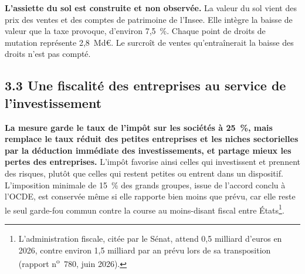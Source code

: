 \documentclass[10pt,a4paper]{article}
\begin{document}
\textbf{L'assiette du sol est construite et non observée.} La valeur du sol vient des prix des ventes et des comptes de
patrimoine de l'Insee. Elle intègre la baisse de valeur que la taxe provoque, d'environ 7,5~\%. Chaque point de droits de
mutation représente 2,8~Md€. Le surcroît de ventes qu'entraînerait la baisse des droits n'est pas compté.

\subsection{3.3 Une fiscalité des entreprises au service de l'investissement}

\textbf{La mesure garde le taux de l'impôt sur les sociétés à 25~\%, mais remplace le taux réduit des petites entreprises et les niches sectorielles par la déduction immédiate des investissements, et partage mieux les pertes des entreprises.} L'impôt favorise ainsi celles qui investissent et prennent des risques, plutôt que celles qui restent petites ou entrent dans un dispositif. L'imposition minimale de 15~\% des grands groupes, issue de l'accord conclu à l'OCDE, est conservée même si elle rapporte bien moins que prévu, car elle reste le seul garde-fou commun contre la course au moins-disant fiscal entre États\footnote{L'administration fiscale, citée par le Sénat, attend 0,5 milliard d'euros en 2026, contre environ 1,5 milliard par an prévu lors de sa transposition (rapport n\textsuperscript{o}~780, juin 2026).}.
\end{document}
